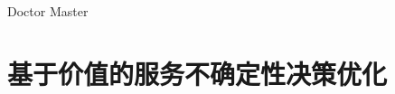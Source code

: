 \documentclass[cs4size,openany,UTF8]{ctexbook}
\begin{document}
\newif\ifxueweidoctor
\newif\ifxueweimaster
\def\temp{Doctor}
\ifx\temp\xuewei
  \xueweidoctortrue  \xueweimasterfalse
\fi
\def\temp{Master}
\ifx\temp\xuewei
  \xueweidoctorfalse  \xueweimastertrue
\fi




\chapter{基于价值的服务不确定性决策优化}






%
%
%
%
%



\addtolength{\bibsep}{-0.8em}
\nocite{*}

\end{document}
